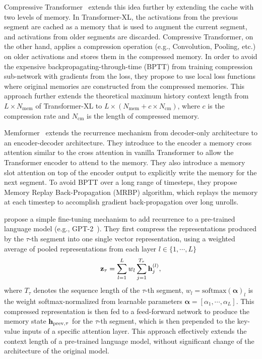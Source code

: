 \documentclass[manuscript,acmsmall,screen,nonacm]{acmart}
\theoremstyle{definition}
\begin{document}
Compressive Transformer~\cite{rae2019compressive} extends this idea further by extending the cache with two levels of memory. In Transformer-XL, the activations from the previous segment are cached as a memory that is used to augment the current segment, and activations from older segments are discarded. Compressive Transformer, on the other hand,  applies a compression operation (e.g., Convolution, Pooling, etc.) on older activations and stores them in the compressed memory. In order to avoid the expensive backpropagating-through-time (BPTT) from training compression sub-network with gradients from the loss, they propose to use local loss functions where original memories are constructed from the compressed memories. This approach further extends the theoretical maximum history context length from $L\times N_{\text{mem}}$ of Transformer-XL to $L\times (N_{\text{mem}}+c\times N_{\text{cm}})$, where $c$ is the compression rate and $N_{\text{cm}}$ is the length of compressed memory.

 Memformer~\cite{wu2020memformer} extends the recurrence mechanism from decoder-only architecture to an encoder-decoder architecture. They introduce to the encoder a memory cross attention similar to the cross attention in vanilla Transformer to allow the Transformer encoder to attend to the memory. They also introduce a memory slot attention on top of the encoder output to explicitly write the memory for the next segment. To avoid BPTT over a long range of timesteps, they propose Memory
Replay Back-Propagation (MRBP) algorithm, which replays
the memory at each timestep to accomplish gradient back-propagation over long unrolls.

\citet{yoshida20recurrenceptm} propose a simple fine-tuning mechanism to add recurrence to a pre-trained language model (e.g., GPT-2~\cite{radford2019gpt2}).
\ifx \smv \undefined
They first compress the representations produced by the $\tau$-th segment into one single vector representation, using a weighted average of pooled representations from each layer $l\in\{1,\cdots,L\}$
\begin{equation}
    \mathbf{z}_\tau=\sum_{l=1}^Lw_l\sum_{j=1}^{T_\tau}\mathbf{h}_j^{(l)},
\end{equation}
where $T_\tau$ denotes the sequence length of the $\tau$-th segment, $w_l=\mathrm{softmax}(\mathbf\alpha)_l$ is the weight softmax-normalized from learnable parameters $\mathbf\alpha=[\alpha_1,\cdots,\alpha_L]$. This compressed representation is then fed to a  feed-forward network to produce the memory state $\mathbf{h}_{\text{prev},\tau}$ for the $\tau$-th segment, which is then prepended to the key-value inputs of a specific attention layer. This approach effectively extends the context length of a pre-trained language model, without significant change of the architecture of the original model.
\fi
\end{document}
